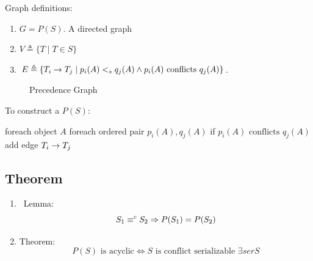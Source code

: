 \documentclass[a4paper]{report}
\begin{document}
Graph definitions: 
\begin{enumerate}
\item $G = P(S)$. A directed graph 
\item $V \triangleq \{T\mid T\in S\}$
\item $E \triangleq \{T_i \rightarrow T_j\mid p_i(A) <_s q_j(A) \wedge p_i(A)  \text{ conflicts } q_j(A)\}$. 
\end{enumerate}
\begin{figure}[hbtp]
\centering
{}
\caption{Precedence Graph}
\label{fig:precdnGraph}
\end{figure}
To construct a $P(S)$:
\begin{pseudo}
foreach object $A$
  foreach ordered pair $p_i(A), q_j(A)$
    if $p_i(A) \text{ conflicts } q_j(A)$
      add edge $T_i \rightarrow T_j$
\end{pseudo}
\subsection{Theorem}
\begin{enumerate}
\item\ Lemma: 
$$S_1 \equiv^c S_2 \Rightarrow P(S_1)=P(S_2)$$
\item Theorem:
$$P(S) \text{ is acyclic} \Leftrightarrow S \text{ is conflict serializable } \exists serS$$
\end{enumerate}
\end{document}
